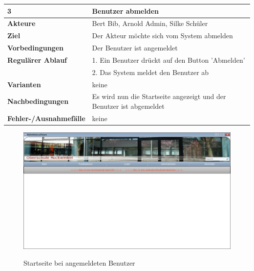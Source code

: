 \documentclass[fontsize=12pt,paper=a4,twoside]{scrartcl}
\begin{document}
\begin{table}[htbp]
\label{3}
\begin{tabular}{|l|p{10cm}|}
\hline 
\textbf{3} & \textbf{Benutzer abmelden} \\ \hline
\textbf{Akteure} & Bert Bib, Arnold Admin, Silke Schüler \\ \hline
\textbf{Ziel} & Der Akteur möchte sich vom System abmelden  \\ \hline
\textbf{Vorbedingungen} & Der Benutzer ist angemeldet  \\ \hline
\textbf{Regulärer Ablauf} & 
1. Ein Benutzer drückt auf den Button 'Abmelden' \\
&2. Das System meldet den Benutzer ab\\
\hline
\textbf{Varianten} & 
keine \\ \hline
\textbf{Nachbedingungen} & Es wird nun die Startseite angezeigt und der Benutzer ist abgemeldet \\ \hline
\textbf{Fehler-/Ausnahmefälle} & keine
\end{tabular}
\end{table}

\begin{figure}[htbp]
\caption{Startseite bei angemeldeten Benutzer}
\includegraphics[width=1\textwidth]{WebApp-Screens/Startscreen-loggedIn.png}
  \label{startlog}
\end{figure}
\end{document}
